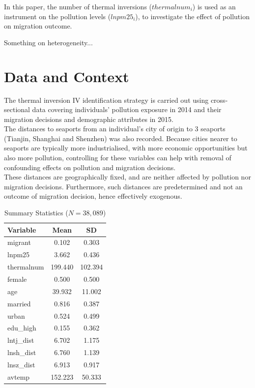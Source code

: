 \documentclass[11pt,twocolumn]{article}
\begin{document}
\noindent In this paper, the number of thermal inversions ($thermalnum_i$) is used as an instrument on the pollution levels ($lnpm25_i$), to investigate the effect of pollution on migration outcome. 

Something on heterogeneity...

\section{Data and Context}
The thermal inversion IV identification strategy is carried out using cross-sectional data covering individuals' pollution exposure in 2014 and their migration decisions and demographic attributes in 2015.\\

The distances to seaports from an individual's city of origin to 3 seaports (Tianjin, Shanghai and Shenzhen) was also recorded. Because cities nearer to seaports are typically more industrialised, with more economic opportunities but also more pollution, controlling for these variables can help with removal of confounding effects on pollution and migration decisions.\\ 

These distances are geographically fixed, and are neither affected by pollution nor migration decisions. Furthermore, such distances are predetermined and not an outcome of migration decision, hence effectively exogenous.\\

\begin{table}[!htb]
\centering
\caption{Summary Statistics ($N = 38{,}089$)}
\label{tab:summary}
\small
\begin{tabular}{lcc}
\toprule
Variable & Mean & SD \\
\midrule
migrant          & 0.102   & 0.303   \\
lnpm25           & 3.662   & 0.436   \\
thermalnum       & 199.440 & 102.394 \\
female           & 0.500   & 0.500   \\
age              & 39.932  & 11.002  \\
married          & 0.816   & 0.387   \\
urban            & 0.524   & 0.499   \\
edu\_high        & 0.155   & 0.362   \\
lntj\_dist       & 6.702   & 1.175   \\
lnsh\_dist       & 6.760   & 1.139   \\
lnsz\_dist       & 6.913   & 0.917   \\
avtemp           & 152.223 & 50.333  \\
\bottomrule
\end{tabular}
\end{table}
\end{document}
